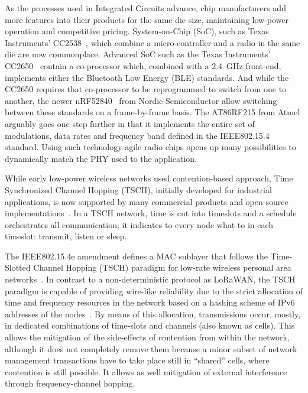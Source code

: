 \documentclass[sensors,article,submit,moreauthors,pdftex]{Definitions/mdpi}
\begin{document}
As the processes used in Integrated Circuits advance, chip manufacturers add more features into their products for the same die size,
    maintaining low-power operation and
    competitive pricing.
System-on-Chip (SoC), such as Texas Instruments' CC2538~\cite{datasheet_cc2538}, which combine a micro-controller and a radio in the same die are now commonplace.
Advanced SoC such as the Texas Instruments' CC2650~\cite{datasheet_cc2650} contain a co-processor which, combined with a 2.4~GHz front-end, implements either the Bluetooth Low Energy (BLE) standards.
And while the CC2650 requires that co-processor to be reprogrammed to switch from one to another,
    the newer nRF52840~\cite{datasheet_nrf52840} from Nordic Semiconductor allow switching between these standards on a frame-by-frame basis.
The AT86RF215 from Atmel arguably goes one step further in that it implements the entire set of modulations, data rates and frequency band defined in the IEEE802.15.4 standard.
Using such technology-agile radio chips opens up many possibilities to dynamically match the PHY used to the application.


While early low-power wireless networks used contention-based approach,
    Time Synchronized Channel Hopping (TSCH), initially developed for industrial applications,
    is now supported by many commercial products and open-source implementations~\cite{watteyne16industrial}.
In a TSCH network, time is cut into timeslots and a schedule orchestrates all communication;
    it indicates to every node what to in each timeslot: transmit, listen or sleep.


The IEEE802.15.4e amendment defines a MAC sublayer that follows the Time-Slotted Channel Hopping (TSCH) paradigm for low-rate wireless personal area networks~\cite{std_ieee802154}.
In contrast to a non-deterministic protocol as LoRaWAN, the TSCH paradigm is capable of providing wire-like reliability due to the strict allocation of time and frequency resources in the network based on a hashing scheme of IPv6 addresses of the nodes~\cite{draft-ietf-6tisch-msf}.
By means of this allocation, transmissions occur, mostly, in dedicated combinations of time-slots and channels (also known as cells).
This allows the mitigation of the side-effects of contention from within the network, although it does not completely remove them because a minor subset of network management transactions have to take place still in ``shared'' cells, where contention is still possible.
It allows as well mitigation of external interference through frequency-channel hopping.
\end{document}
